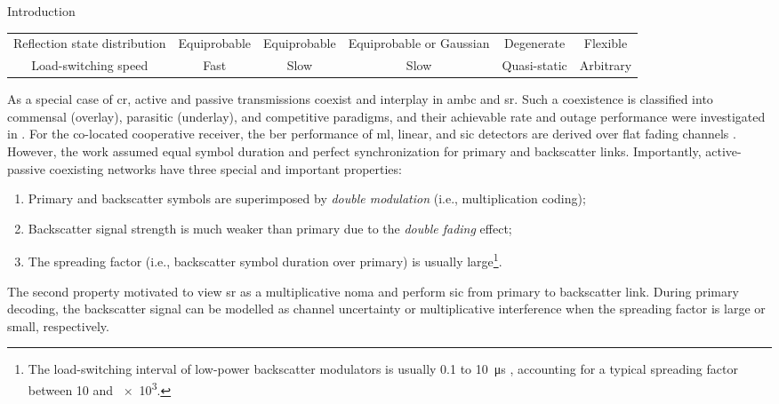 \documentclass[journal]{IEEEtran}
\begin{document}
\begin{section}{Introduction}
\begin{table*}[!t]
\begin{tabularx}{\textwidth}{CCCCCC}
			Reflection state distribution          & Equiprobable        & Equiprobable                & Equiprobable or Gaussian                        & Degenerate          & Flexible                                                    \\
			Load-switching speed                   & Fast                & Slow                        & Slow                                            & Quasi-static        & Arbitrary                                                   \\ \bottomrule
		\end{tabularx}
	\end{table*}

	As a special case of \gls{cr}, active and passive transmissions coexist and interplay in \gls{ambc} and \gls{sr}.
	Such a coexistence is classified into commensal (overlay), parasitic (underlay), and competitive paradigms, and their achievable rate and outage performance were investigated in \cite{Guo2019b,Ding2020}.
	For the co-located cooperative receiver, the \gls{ber} performance of \gls{ml}, linear, and \gls{sic} detectors are derived over flat fading channels \cite{Yang2018}.
	However, the work assumed equal symbol duration and perfect synchronization for primary and backscatter links.
	Importantly, active-passive coexisting networks have three special and important properties:
	\begin{enumerate}
		\item Primary and backscatter symbols are superimposed by \emph{double modulation} (i.e., multiplication coding);
		\item Backscatter signal strength is much weaker than primary due to the \emph{double fading} effect;
		\item The spreading factor (i.e., backscatter symbol duration over primary) is usually large\footnote{The load-switching interval of low-power backscatter modulators is usually \num{0.1} to \qty{10}{\us} \cite{Torres2021}, accounting for a typical spreading factor between \num{10} and \num{e3}.}.
	\end{enumerate}
	The second property motivated \cite{Long2020a,Liang2020,Guo2019b,Ding2020,Zhou2019a,Wu2021a,Xu2021a,Yang2021a,Yang2018,Han2021,Zhang2022} to view \gls{sr} as a multiplicative \gls{noma} and perform \gls{sic} from primary to backscatter link.
	During primary decoding, the backscatter signal can be modelled as channel uncertainty or multiplicative interference when the spreading factor is large or small, respectively.

\end{section}
\end{document}
